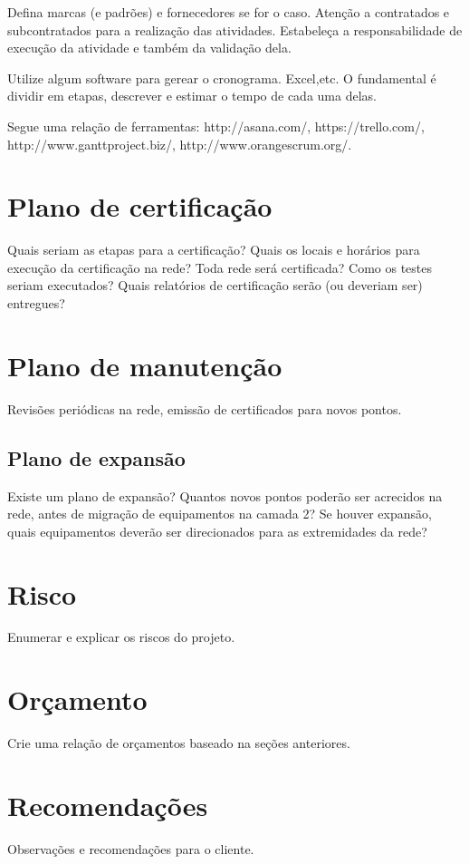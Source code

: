 \documentclass[	DIV=calc,%
							paper=a4,%
							fontsize=12pt,%
							onecolumn]{scrartcl}	 					%
\begin{document}
Defina marcas (e padrões) e fornecedores se for o caso. Atenção a contratados e subcontratados para a realização das atividades. Estabeleça a responsabilidade de execução da atividade e também da validação dela.

Utilize algum software para gerear o cronograma. Excel,etc. O fundamental é dividir em etapas, descrever e estimar o tempo de cada uma delas.

Segue uma relação de ferramentas:
http://asana.com/, 
https://trello.com/, 
http://www.ganttproject.biz/, 
http://www.orangescrum.org/. 

\section{Plano de certificação}
Quais seriam as etapas para a certificação? 
Quais os locais e horários para execução da certificação na rede? Toda rede será certificada?
Como os testes seriam executados?
Quais relatórios de certificação serão (ou deveriam ser) entregues? 

\section{Plano de manutenção}

Revisões periódicas na rede, emissão de certificados para novos pontos.

\subsection{Plano de expansão}
Existe um plano de expansão? Quantos novos pontos poderão ser acrecidos na rede, antes de migração de equipamentos na camada 2? Se houver expansão, quais equipamentos deverão ser direcionados para as extremidades da rede? 

\section{Risco}
Enumerar e explicar os riscos do projeto.

\section{Orçamento}
Crie uma relação de orçamentos baseado na seções anteriores.

\section{Recomendações}
Observações e recomendações para o cliente.
\end{document}
